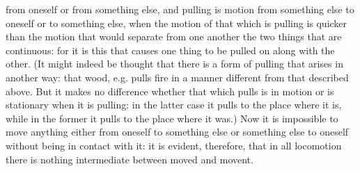 \documentclass[12pt]{article}
\begin{document}
from oneself or from something else, and pulling is motion from something else to oneself or to something else, when the motion of that which is pulling is quicker than the motion that would separate from one another the two things that are continuous: for it is this that causes one thing to be pulled on along with the other. (It might indeed be thought that there is a form of pulling that arises in another way: that wood, e.g. pulls fire in a manner different from that described above. But it makes no difference whether that which pulls is in motion or is stationary when it is pulling: in the latter case it pulls to the place where it is, while in the former it pulls to the place where it was.) Now it is impossible to move anything either from oneself to something else or something else to oneself without being in contact with it: it is evident, therefore, that in all locomotion there is nothing intermediate between moved and movent.
\end{document}
